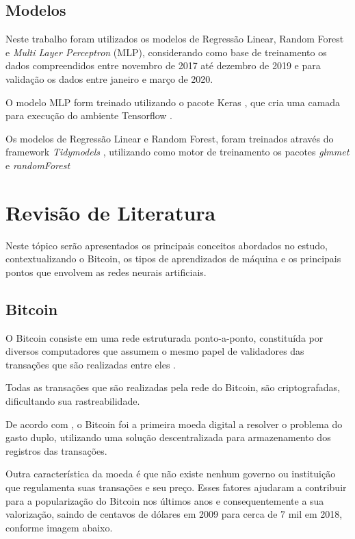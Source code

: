 \documentclass[12pt]{article}
\begin{document}
\subsection{Modelos}

Neste trabalho foram utilizados os modelos de Regressão Linear, Random Forest e 
\textit{Multi Layer Perceptron} (MLP), considerando como base de treinamento
os dados compreendidos entre novembro de 2017 até dezembro de 2019 e para 
validação os dados entre janeiro e março de 2020.

O modelo MLP form treinado utilizando o pacote Keras \cite{chollet2015}, que 
cria uma camada para execução do ambiente Tensorflow \cite{tensorflow2015}.

Os modelos de Regressão Linear e Random Forest, foram treinados através do
framework \textit{Tidymodels} \cite{tidymodels}, utilizando como motor de 
treinamento os pacotes \textit{glmmet} \cite{glmnet} e \textit{randomForest} 
\cite{randomforest}

\section{Revisão de Literatura}

Neste tópico serão apresentados os principais conceitos abordados no estudo,
contextualizando o Bitcoin, os tipos de aprendizados de máquina e os principais 
pontos que envolvem as redes neurais artificiais.

\subsection{Bitcoin}

O Bitcoin consiste em uma rede estruturada ponto-a-ponto, constituída por 
diversos computadores que assumem o mesmo papel de validadores das transações 
que são realizadas entre eles \cite{nakamoto2019bitcoin}.

Todas as transações que são realizadas pela rede do Bitcoin, são criptografadas,
dificultando sua rastreabilidade.

De acordo com \cite{shawn:2017}, o Bitcoin foi a primeira moeda digital a 
resolver o problema do gasto duplo, utilizando uma solução descentralizada para 
armazenamento dos registros das transações.

Outra característica da moeda é que não existe nenhum governo ou instituição que
regulamenta suas transações e seu preço. Esses fatores ajudaram a contribuir 
para a popularização do Bitcoin nos últimos anos e consequentemente a sua 
valorização, saindo de centavos de dólares em 2009 para cerca de 7 mil em 2018, 
conforme imagem abaixo.
\end{document}
